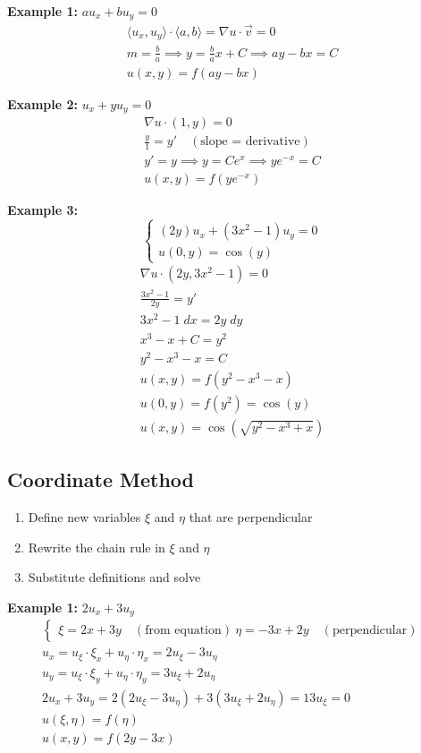 \documentclass[10pt]{article}
\newcommand{\brak}[1]{\langle #1 \rangle}
\begin{document}
\textbf{Example 1:} $au_x + bu_y = 0$ 
\begin{gather*}
    \brak{u_x, u_y} \cdot \brak{a, b} = \nabla u \cdot \vec{v} =0\\
    m = \frac{b}{a} \implies y = \frac{b}{a}x + C \implies ay-bx =C\\
    u(x, y) = f(ay - bx)
\end{gather*}

\textbf{Example 2:} $u_x + yu_y =0$
\begin{gather*}
    \nabla u \cdot (1, y) = 0\\
    \frac{y}{1} = y' \quad (\text{slope = derivative})\\
    y' = y \implies y = Ce^x \implies ye^{-x} = C\\
    u(x, y) = f(ye^{-x})
\end{gather*}

\textbf{Example 3:}
\[\begin{cases}
    (2y)u_x + (3x^2 - 1)u_y = 0\\
    u(0, y) = \cos(y)
\end{cases}\]
\begin{gather*}
    \nabla u \cdot (2y, 3x^2 - 1) = 0\\
    \frac{3x^2 - 1}{2y} = y'\\
    3x^2 - 1 \; dx = 2y\; dy\\
    x^3- x + C = y^2 \\
    y^2 - x^3 - x = C\\
    u(x, y) = f(y^2 - x^3 - x)\\
    u(0, y) = f(y^2) = \cos(y)\\
    u(x, y) = \cos(\sqrt{y^2 - x^3 + x})  
\end{gather*}

\subsection{Coordinate Method} 
\begin{enumerate}
    \item Define new variables $\xi$ and $\eta$ that are perpendicular 
    \item Rewrite the chain rule in $\xi$ and $\eta$ 
    \item Substitute definitions and solve 
\end{enumerate} 

\textbf{Example 1:} $2u_x + 3u_y$
\begin{gather*}
    \begin{cases*}
        \xi = 2x + 3y \quad(\text{from equation})\
        \eta = -3x + 2y \quad(\text{perpendicular})
    \end{cases*}\\
    u_x = u_\xi \cdot \xi_x + u_\eta \cdot \eta_x = 2u_\xi - 3u_\eta\\
    u_y = u_\xi \cdot \xi_y + u_\eta \cdot \eta_y = 3u_\xi + 2u_\eta\\
    2u_x + 3u_y = 2(2u_\xi - 3u_\eta) + 3(3u_\xi + 2u_\eta) = 13u_\xi = 0\\
    u(\xi, \eta) = f(\eta)\\
    u(x, y) = f(2y - 3x)
\end{gather*}
\end{document}
